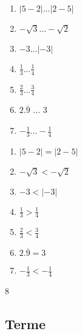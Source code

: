 {{\begin{multicols}{2}
\begin{enumerate}[label=\alph*)]
 \item$|5-2| ... |2-5|$
 \item$-\sqrt{3} ... -\sqrt{2}$ 
 \item$-3 ... |-3|$ 
 \item$\frac{1}{3} ... \frac{1}{4}$ 
 \item$\frac{2}{3} ... \frac{3}{4}$
 \item$2.\overline{9}$ ... 3
 \item$-\frac{1}{3} ... -\frac{1}{4}$ 
\end{enumerate}
\end{multicols}
}{%
\begin{multicols}{2}
\begin{enumerate}[label=\alph*)]
 \item$|5-2| =  |2-5|$
 \item$-\sqrt{3} < -\sqrt{2}$ 
 \item$-3 < |-3|$ 
 \item$\frac{1}{3} > \frac{1}{4}$
 \item$\frac{2}{3} < \frac{3}{4}$
 \item$2.\overline{9} = 3$
 \item$-\frac{1}{3} <-\frac{1}{4}$
\end{enumerate}
\end{multicols}
}{8}%


\subsection{Terme}

}
